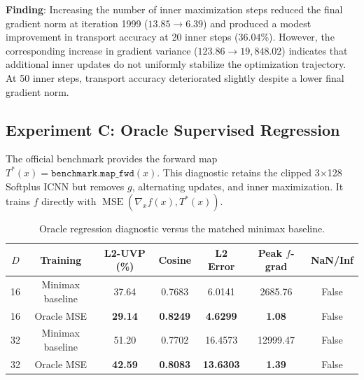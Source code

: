 \documentclass[11pt,a4paper]{article}
\begin{document}
\begin{table}[h]
\centering
\caption{Experiment B: Optimization Trajectory Statistics at $D=16$}
\label{tab:exp_b}
\end{table}

\textbf{Finding}: Increasing the number of inner maximization steps reduced the final gradient norm at iteration 1999 ($13.85 \to 6.39$) and produced a modest improvement in transport accuracy at 20 inner steps ($36.04\%$). However, the corresponding increase in gradient variance ($123.86 \to 19,848.02$) indicates that additional inner updates do not uniformly stabilize the optimization trajectory. At 50 inner steps, transport accuracy deteriorated slightly despite a lower final gradient norm.

\subsection{Experiment C: Oracle Supervised Regression}
The official benchmark provides the forward map $T^*(x)=\texttt{benchmark.map\_fwd}(x)$. This diagnostic retains the clipped 3$\times$128 Softplus ICNN but removes $g$, alternating updates, and inner maximization. It trains $f$ directly with $\operatorname{MSE}(\nabla_x f(x),T^*(x))$.

\begin{table}[h]
\centering
\caption{Oracle regression diagnostic versus the matched minimax baseline.}
\label{tab:oracle}
\begin{tabular}{ccccccc}
\toprule
\textbf{$D$} & \textbf{Training} & \textbf{L2-UVP (\%)} & \textbf{Cosine} & \textbf{L2 Error} & \textbf{Peak $f$-grad} & \textbf{NaN/Inf} \\
\midrule
16 & Minimax baseline & 37.64 & 0.7683 & 6.0141 & 2685.76 & False \\
16 & Oracle MSE       & \textbf{29.14} & \textbf{0.8249} & \textbf{4.6299} & \textbf{1.08} & False \\
32 & Minimax baseline & 51.20 & 0.7702 & 16.4573 & 12999.47 & False \\
32 & Oracle MSE       & \textbf{42.59} & \textbf{0.8083} & \textbf{13.6303} & \textbf{1.39} & False \\
\bottomrule
\end{tabular}
\end{table}
\end{document}
